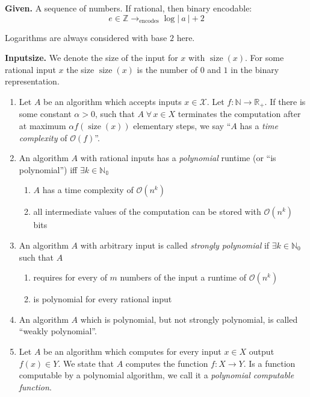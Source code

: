 \documentclass{article}
\newcommand{\card}[1]{\left|\:\!#1\:\!\right|}
\newcommand{\given}[1]{\textbf{Given.} #1\par}
\newcommand{\fall}{\;\forall\,}
\begin{document}
\given{A sequence of numbers. If rational, then binary encodable:
\[
  e \in \mathbb{Z} \rightarrow_{\text{encodes}} \log{\card{a} + 2}
\]}

Logarithms are always considered with base $2$ here.

\textbf{Inputsize.} We denote the size of the input for $x$ with $\operatorname{size}(x)$. For some rational input $x$ the size $\operatorname{size}(x)$ is the number of $0$ and $1$ in the binary representation.

\begin{enumerate}
  \item Let $A$ be an algorithm which accepts inputs $x \in \mathcal{X}$. Let $f: \mathbb{N} \rightarrow \mathbb{R}_+$. If there is some constant $\alpha > 0$, such that $A \fall x \in X$ terminates the computation after at maximum $\alpha f(\operatorname{size}(x))$ elementary steps, we say ``$A$ has a \emph{time complexity} of $\mathcal{O}(f)$''.

  \item An algorithm $A$ with rational inputs has a \emph{polynomial} runtime (or ``is polynomial'') iff $\exists k \in \mathbb{N_0}$
    \begin{enumerate}
      \item $A$ has a time complexity of $\mathcal{O}(n^k)$
      \item all intermediate values of the computation can be stored with $\mathcal{O}(n^k)$ bits
    \end{enumerate}

  \item An algorithm $A$ with arbitrary input is called \emph{strongly polynomial} if $\exists k \in \mathbb{N}_0$ such that $A$
    \begin{enumerate}
      \item requires for every of $m$ numbers of the input a runtime of $\mathcal{O}(n^k)$
      \item is polynomial for every rational input
    \end{enumerate}

  \item An algorithm $A$ which is polynomial, but not strongly polynomial, is called ``weakly polynomial''.

  \item Let $A$ be an algorithm which computes for every input $x \in X$ output $f(x) \in Y$. We state that $A$ computes the function $f: X \rightarrow Y$. Is a function computable by a polynomial algorithm, we call it a \emph{polynomial computable function}.
\end{enumerate}
\end{document}
